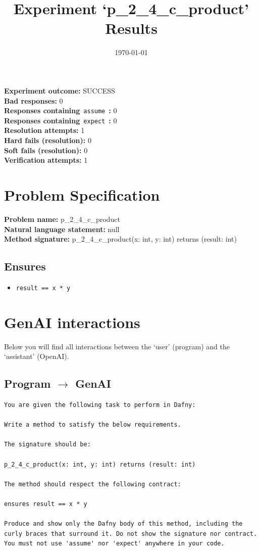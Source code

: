 \documentclass{article}
\begin{document}
\title{Experiment `p\_2\_4\_c\_product' Results}
\author{\today}
\date{}
\maketitle
\textbf{Experiment outcome: }SUCCESS
\\\textbf{Bad responses: }0
\\\textbf{Responses containing}~\texttt{assume}~\textbf{: }0
\\\textbf{Responses containing}~\texttt{expect}~\textbf{: }0
\\\textbf{Resolution attempts: }1
\\\textbf{Hard fails (resolution): }0
\\\textbf{Soft fails (resolution): }0
\\\textbf{Verification attempts: }1
\section*{Problem Specification}
\textbf{Problem name: }p\_2\_4\_c\_product
\\\textbf{Natural language statement: }null
\\\textbf{Method signature: }p\_2\_4\_c\_product(x: int, y: int) returns (result: int)
\subsection*{Ensures}
\begin{itemize}
\item \texttt{result == x * y}
\end{itemize}
\clearpage
\section*{GenAI interactions}
Below you will find all interactions between the `user' (program) and the `assistant' (OpenAI).
\subsection*{Program $\rightarrow$ GenAI}
\begin{lstlisting}
You are given the following task to perform in Dafny:

Write a method to satisfy the below requirements.

The signature should be:

p_2_4_c_product(x: int, y: int) returns (result: int)

The method should respect the following contract:

ensures result == x * y

Produce and show only the Dafny body of this method, including the curly braces that surround it. Do not show the signature nor contract. You must not use 'assume' nor 'expect' anywhere in your code.
\end{lstlisting}
\end{document}

